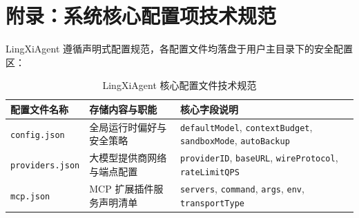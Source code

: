 \documentclass[11pt,a4paper]{article}
\begin{document}
\section{附录：系统核心配置项技术规范}

LingXiAgent 遵循声明式配置规范，各配置文件均落盘于用户主目录下的安全配置区：

\begin{table}[htbp]
\centering
\small
\begin{tabular}{lp{50mm}p{55mm}}
\toprule
\textbf{配置文件名称} & \textbf{存储内容与职能} & \textbf{核心字段说明} \\
\midrule
\texttt{config.json} & 全局运行时偏好与安全策略 & \texttt{defaultModel}, \texttt{contextBudget}, \texttt{sandboxMode}, \texttt{autoBackup} \\
\texttt{providers.json} & 大模型提供商网络与端点配置 & \texttt{providerID}, \texttt{baseURL}, \texttt{wireProtocol}, \texttt{rateLimitQPS} \\
\texttt{mcp.json} & MCP 扩展插件服务声明清单 & \texttt{servers}, \texttt{command}, \texttt{args}, \texttt{env}, \texttt{transportType} \\
\bottomrule
\end{tabular}
\caption{LingXiAgent 核心配置文件技术规范}
\end{table}
\end{document}
